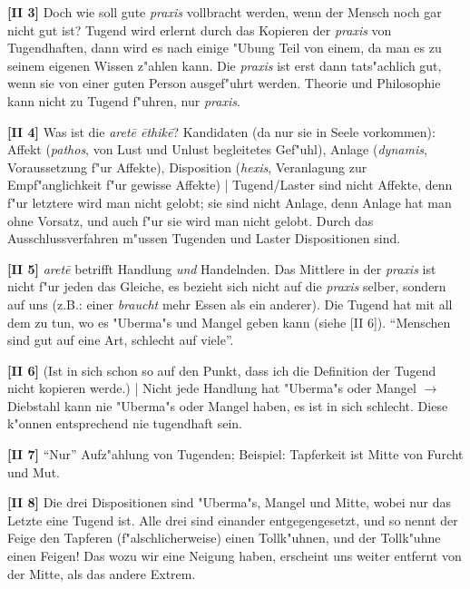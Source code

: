 \documentclass[a4paper]{article}
\begin{document}
\noindent \textbf{[II 3]} Doch wie soll gute \emph{praxis} vollbracht werden, wenn der Mensch noch gar nicht gut ist? Tugend wird erlernt durch das Kopieren der \emph{praxis} von Tugendhaften, dann wird es nach einige "Ubung Teil von einem, da man es zu seinem eigenen Wissen z"ahlen kann. Die \emph{praxis} ist erst dann tats"achlich gut, wenn sie von einer guten Person ausgef"uhrt werden. Theorie und Philosophie kann nicht zu Tugend f"uhren, nur \emph{praxis}.\newline

\noindent \textbf{[II 4]} Was ist die \emph{aret\={e} \={e}thik\={e}}? Kandidaten (da nur sie in Seele vorkommen): Affekt (\emph{pathos}, von Lust und Unlust begleitetes Gef"uhl), Anlage (\emph{dynamis}, Voraussetzung f"ur Affekte), Disposition (\emph{hexis}, Veranlagung zur Empf"anglichkeit f"ur gewisse Affekte) | Tugend/Laster sind nicht Affekte, denn f"ur letztere wird man nicht gelobt; sie sind nicht Anlage, denn Anlage hat man ohne Vorsatz, und auch f"ur sie wird man nicht gelobt. Durch das Ausschlussverfahren m"ussen Tugenden und Laster Dispositionen sind. \newline

\noindent \textbf{[II 5]} \emph{aret\={e}} betrifft Handlung \emph{und} Handelnden. Das Mittlere in der \emph{praxis} ist nicht f"ur jeden das Gleiche, es bezieht sich nicht auf die \emph{praxis} selber, sondern auf uns (z.B.: einer \emph{braucht} mehr Essen als ein anderer). Die Tugend hat mit all dem zu tun, wo es "Uberma"s und Mangel geben kann (siehe [II 6]). "`Menschen sind gut auf eine Art, schlecht auf viele"'. \newline

\noindent \textbf{[II 6]} (Ist in sich schon so auf den Punkt, dass ich die Definition der Tugend nicht kopieren werde.) | Nicht jede Handlung hat "Uberma"s oder Mangel $\rightarrow$ Diebstahl kann nie "Uberma"s oder Mangel haben, es ist in sich schlecht. Diese k"onnen entsprechend nie tugendhaft sein.\newline

\noindent \textbf{[II 7]} "`Nur"' Aufz"ahlung von Tugenden; Beispiel: Tapferkeit ist Mitte von Furcht und Mut.\newline

\noindent \textbf{[II 8]} Die drei Dispositionen sind "Uberma"s, Mangel und Mitte, wobei nur das Letzte eine Tugend ist. Alle drei sind einander entgegengesetzt, und so nennt der Feige den Tapferen (f"alschlicherweise) einen Tollk"uhnen, und der Tollk"uhne einen Feigen! Das wozu wir eine Neigung haben, erscheint uns weiter entfernt von der Mitte, als das andere Extrem.\newline
\end{document}
